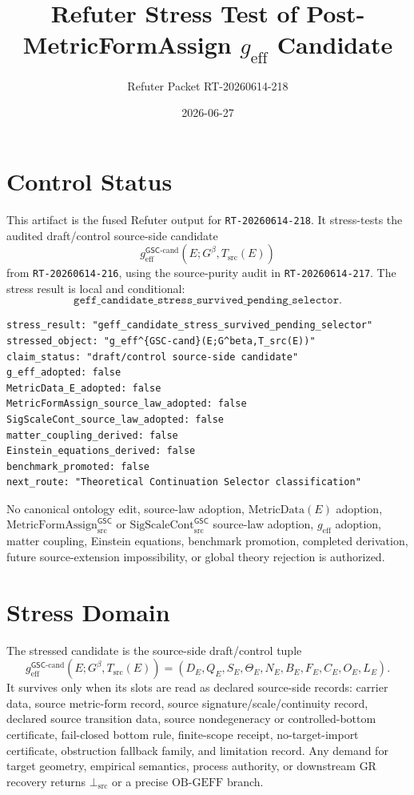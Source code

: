 \documentclass[11pt]{article}
\title{Refuter Stress Test of Post-MetricFormAssign \texorpdfstring{$g_{\mathrm{eff}}$}{g_eff} Candidate}
\author{Refuter Packet RT-20260614-218}
\date{2026-06-27}
\newcommand{\Gbeta}{G^\beta}
\newcommand{\SigScaleCont}{\mathrm{SigScaleCont}^{\mathsf{GSC}}_{\mathrm{src}}}
\newcommand{\MetricFormAssign}{\mathrm{MetricFormAssign}^{\mathsf{GSC}}_{\mathrm{src}}}
\newcommand{\geff}{g_{\mathrm{eff}}}
\newcommand{\geffCand}{g_{\mathrm{eff}}^{\mathsf{GSC}\mbox{-}\mathrm{cand}}}
\newcommand{\BottomSrc}{\bot_{\mathrm{src}}}
\newcommand{\OBGEFF}{\mathrm{OB\mbox{-}GEFF}}
\begin{document}
\maketitle

\section{Control Status}

This artifact is the fused Refuter output for \texttt{RT-20260614-218}. It
stress-tests the audited draft/control source-side candidate
\[
  \geffCand(E;\Gbeta,T_{\mathrm{src}}(E))
\]
from \texttt{RT-20260614-216}, using the source-purity audit in
\texttt{RT-20260614-217}. The stress result is local and conditional:
\[
  \texttt{geff\_candidate\_stress\_survived\_pending\_selector}.
\]

\begin{verbatim}
stress_result: "geff_candidate_stress_survived_pending_selector"
stressed_object: "g_eff^{GSC-cand}(E;G^beta,T_src(E))"
claim_status: "draft/control source-side candidate"
g_eff_adopted: false
MetricData_E_adopted: false
MetricFormAssign_source_law_adopted: false
SigScaleCont_source_law_adopted: false
matter_coupling_derived: false
Einstein_equations_derived: false
benchmark_promoted: false
next_route: "Theoretical Continuation Selector classification"
\end{verbatim}

No canonical ontology edit, source-law adoption, \(\mathrm{MetricData}(E)\)
adoption, \(\MetricFormAssign\) or \(\SigScaleCont\) source-law adoption,
\(\geff\) adoption, matter coupling, Einstein equations, benchmark promotion,
completed derivation, future source-extension impossibility, or global theory
rejection is authorized.

\section{Stress Domain}

The stressed candidate is the source-side draft/control tuple
\[
  \geffCand(E;\Gbeta,T_{\mathrm{src}}(E))
  =(D_E,Q_E,S_E,\Theta_E,N_E,B_E,F_E,C_E,O_E,L_E).
\]
It survives only when its slots are read as declared source-side records:
carrier data, source metric-form record, source signature/scale/continuity
record, declared source transition data, source nondegeneracy or
controlled-bottom certificate, fail-closed bottom rule, finite-scope receipt,
no-target-import certificate, obstruction fallback family, and limitation
record. Any demand for target geometry, empirical semantics, process authority,
or downstream GR recovery returns \(\BottomSrc\) or a precise \(\OBGEFF\)
branch.
\end{document}

